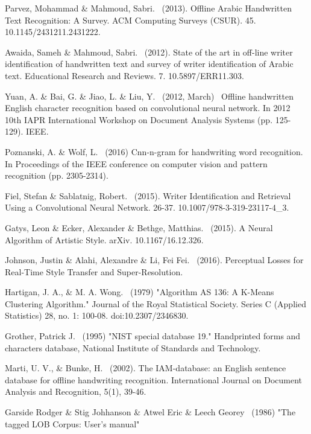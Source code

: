 \documentclass{article}
\begin{document}
\begin{thebibliography}{99}
   Parvez, Mohammad \&  Mahmoud, Sabri. \ (2013). Offline Arabic Handwritten Text Recognition: A Survey. ACM Computing Surveys (CSUR). 45. 10.1145/2431211.2431222.

   Awaida, Sameh \& Mahmoud, Sabri. \ (2012). State of the art in off-line writer identification of handwritten text and survey of writer identification of Arabic text. Educational Research and Reviews. 7. 10.5897/ERR11.303.

   Yuan, A. \& Bai, G. \& Jiao, L. \& Liu, Y. \ (2012, March) \ Offline handwritten English character recognition based on convolutional neural network. In 2012 10th IAPR International Workshop on Document Analysis Systems (pp. 125-129). IEEE.

   Poznanski, A. \& Wolf, L. \ (2016) Cnn-n-gram for handwriting word recognition. In Proceedings of the IEEE conference on computer vision and pattern recognition (pp. 2305-2314).

   Fiel, Stefan \& Sablatnig, Robert. \ (2015). Writer Identification and Retrieval Using a Convolutional Neural Network. 26-37. 10.1007/978-3-319-23117-4\_3.

   Gatys, Leon \& Ecker, Alexander \& Bethge, Matthias. \ (2015). A Neural Algorithm of Artistic Style. arXiv. 10.1167/16.12.326.

   Johnson, Justin \& Alahi, Alexandre \& Li, Fei Fei. \ (2016). Perceptual Losses for Real-Time Style Transfer and Super-Resolution.

   Hartigan, J. A., \& M. A. Wong. \ (1979) "Algorithm AS 136: A K-Means Clustering Algorithm." Journal of the Royal Statistical Society. Series C (Applied Statistics) 28, no. 1: 100-08. doi:10.2307/2346830.

   Grother, Patrick J. \ (1995) "NIST special database 19." Handprinted forms and characters database, National Institute of Standards and Technology.

   Marti, U. V., \& Bunke, H. \ (2002). The IAM-database: an English sentence database for offline handwriting recognition. International Journal on Document Analysis and Recognition, 5(1), 39-46.

   Garside Rodger \& Stig Johhanson \& Atwel Eric \& Leech Georey \ (1986) "The tagged LOB Corpus: User's manual"


\end{thebibliography}
\end{document}
